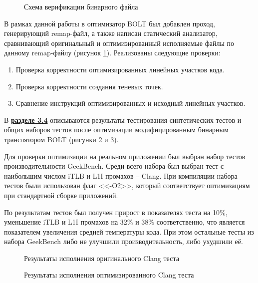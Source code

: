 \begin{figure}[!h]
    \centerfloat{
        \texttt{[image: v2]}
    }
    \caption{Схема верификации бинарного файла}\label{fig:Verif}
\end{figure}

В рамках данной работы в оптимизатор BOLT был добавлен проход, генерирующий remap-файл, а также написан статический анализатор, сравнивающий оригинальный и оптимизированный исполняемые файлы по данному remap-файлу (рисунок \cref{fig:Verif}). Реализованы следующие проверки:

\begin{enumerate}[beginpenalty=10000]
  \item Проверка корректности оптимизированных линейных участков кода.
  \item Проверка корректности создания теневых точек.
  \item Сравнение инструкций оптимизированных и исходный линейных участков.
\end{enumerate}	

В \underline{\textbf{разделе 3.4}} описываются результаты тестирования синтетических тестов и общих наборов тестов после оптимизации модифицированным бинарным транслятором BOLT (рисунки \cref{fig:OrigClang} и \cref{fig:OptClang}).

Для проверки оптимизации на реальном приложении был выбран набор тестов производительности GeekBench. Среди всего набора был выбран тест с наибольшим числом iTLB и L1I промахов – Clang. При компиляции набора тестов были использован флаг <<-O2>>, который соответствует оптимизациям при стандартной сборке приложений.

По результатам тестов был получен прирост в показателях теста на 10\%, уменьшение iTLB и L1I промахов на 32\% и 38\% соответственно, что является показателем увеличения средней температуры кода. При этом остальные тесты из набора GeekBench либо не улучшили производительность, либо ухудшили её.

\begin{figure}[H]
    \centerfloat{
        \texttt{[image: 14]}
    }
    \caption{Результаты исполнения оригинального Clang теста}\label{fig:OrigClang}
\end{figure}

\begin{figure}[H]
    \centerfloat{
        \texttt{[image: 15]}
    }
    \caption{Результаты исполнения оптимизированного Clang теста}\label{fig:OptClang}
\end{figure}

